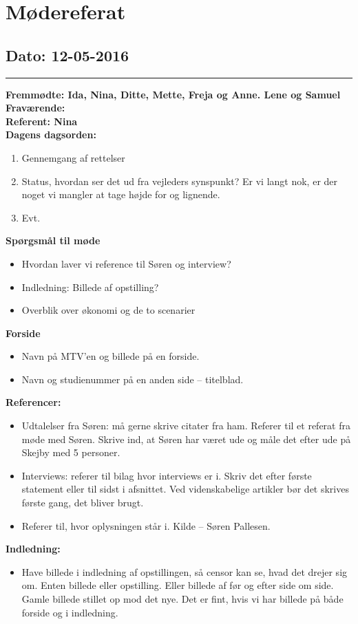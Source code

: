 \chapter{Mødereferat}

\section{Dato: 12-05-2016}
\hrule
\textbf{Fremmødte: Ida, Nina, Ditte, Mette, Freja og Anne. Lene og Samuel} \\
\textbf{Fraværende:} \\
\textbf{Referent: Nina } \\
\textbf{Dagens dagsorden: }
\begin{enumerate}
\item Gennemgang af rettelser
\item Status, hvordan ser det ud fra vejleders synspunkt? Er vi langt nok, er der noget vi mangler at tage højde for og lignende.
\item Evt.
\end{enumerate}
\textbf{Spørgsmål til møde}
\begin{itemize}
\item Hvordan laver vi reference til Søren og interview?
\item Indledning: Billede af opstilling?
\item Overblik over økonomi og de to scenarier
\end{itemize}
\textbf{Forside}
\begin{itemize}
\item Navn på MTV'en og billede på en forside. 
\item Navn og studienummer på en anden side – titelblad. 
\end{itemize}
\textbf{Referencer: }
\begin{itemize}
\item Udtalelser fra Søren: må gerne skrive citater fra ham. Referer til et referat fra møde med Søren. Skrive ind, at Søren har været ude og måle det efter ude på Skejby med 5 personer. 
\item Interviews: referer til bilag hvor interviews er i. Skriv det efter første statement eller til sidst i afsnittet. Ved videnskabelige artikler bør det skrives første gang, det bliver brugt.  
\item Referer til, hvor oplysningen står i. Kilde – Søren Pallesen. 
\end{itemize}
\textbf{Indledning:}
\begin{itemize}
\item Have billede i indledning af opstillingen, så censor kan se, hvad det drejer sig om. Enten billede eller opstilling. Eller billede af før og efter side om side. Gamle billede stillet op mod det nye. Det er fint, hvis vi har billede på både forside og i indledning. 
\end{itemize}
